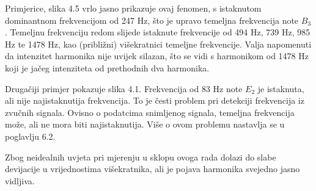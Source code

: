\documentclass[times, utf8, zavrsni, numeric]{fer}
\begin{document}
Primjerice, slika 4.5 vrlo jasno prikazuje ovaj fenomen, s istaknutom dominantnom frekvencijom od 247 Hz, što je upravo temeljna frekvencija note $B_3$. Temeljnu frekvenciju redom slijede istaknute frekvencije od 494 Hz, 739 Hz, 985 Hz te 1478 Hz, kao (približni) višekratnici temeljne frekvencije. Valja napomenuti da intenzitet harmonika nije uvijek silazan, što se vidi s harmonikom od 1478 Hz koji je jačeg intenziteta od prethodnih dva harmonika.

Drugačiji primjer pokazuje slika 4.1. Frekvencija od 83 Hz note $E_2$ je istaknuta, ali nije najistaknutija frekvencija. To je česti problem pri detekciji frekvencija iz zvučnih signala. Ovisno o podatcima snimljenog signala, temeljna frekvencija može, ali ne mora biti najistaknutija.\cite{gustine_2021} Više o ovom problemu nastavlja se u poglavlju 6.2.

Zbog neidealnih uvjeta pri mjerenju u sklopu ovoga rada dolazi do slabe devijacije u vrijednostima višekratnika, ali je pojava harmonika svejedno jasno vidljiva.

\clearpage
\end{document}
